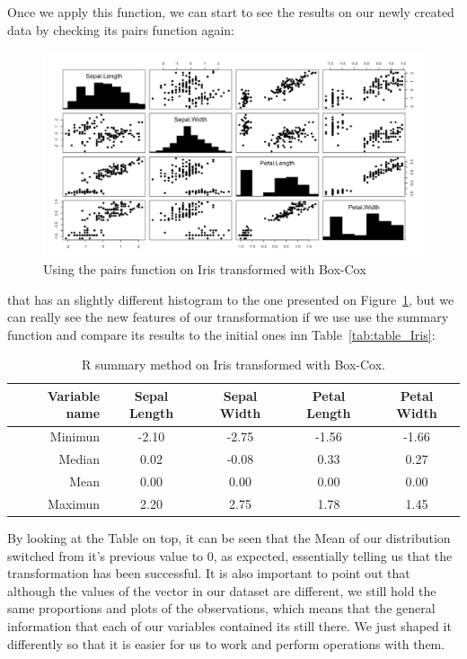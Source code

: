 Once we apply this function, we can start to see the results on our newly created data by checking its pairs function again:
%
\begin{figure}[H]
	\centering
	\includegraphics[width=17cm]{Figuras_tfg/Figure_Boxcox}
	\caption{Using the pairs function on Iris transformed with Box-Cox}
	\label{fig:figure_pairs_iris_bc}
\end{figure}
\noindent
that has an  slightly different histogram to the one presented on Figure~\ref{fig:figure_pairs_iris_bc}, but we can really see the new features of our transformation if we use use the summary function and compare its results to the initial ones inn Table~\ref{tab:table_Iris}: 
%
%
\begin{table}[H]
		\caption{R summary method on Iris transformed with Box-Cox.}
	\begin{center}
	\label{tab:table_Iris_Boxcox}
		\begin{tabular}{r|c|c|c|c} %
			\textbf{Variable name} & \textbf{Sepal Length} & \textbf{Sepal Width} & \textbf{Petal Length} & \textbf{Petal Width}\\
			\hline
			Minimun & -2.10 & -2.75 & -1.56 & -1.66\\
			Median & 0.02 & -0.08 & 0.33 & 0.27\\
			Mean & 0.00 & 0.00 & 0.00 & 0.00\\
			Maximun & 2.20 & 2.75 & 1.78 & 1.45\\
		\end{tabular}
	\end{center}
\end{table}

By looking at the Table on top, it can be seen that the Mean of our distribution switched from it's previous value to 0, as expected,  essentially telling us that the transformation has been successful. It is also important to point out that although the values of the vector in our dataset are different, we still hold the same proportions and plots of the observations, which means that the general information that each of our variables contained its still there. We just shaped it differently so that it is easier for us to work and perform operations with them.

